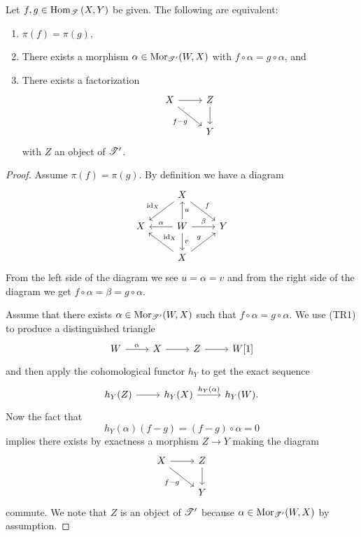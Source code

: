 \documentclass[dissertation.tex]{subfiles}
\begin{document}
\begin{lem}
  Let $f,g \in \operatorname{Hom}_{\mathscr{T}}\left(X,Y\right)$ be given.
  The following are equivalent:
  \begin{enumerate}
  \item
    $\pi(f) = \pi(g)$,
  \item
    There exists a morphism $\alpha \in \operatorname{Mor}_{\mathscr{T}^\prime}(W,X)$ with $f \circ \alpha = g \circ \alpha$, and
  \item
    There exists a factorization
    $$\begin{tikzcd}
      X \arrow{r}\arrow[swap]{rd}{f - g} & Z \arrow{d}\\
      & Y
    \end{tikzcd}$$
    with $Z$ an object of $\mathscr{T}^\prime$.
  \end{enumerate}
  
  \begin{proof}
    Assume $\pi(f) = \pi(g)$.
    By definition we have a diagram
    $$\begin{tikzcd}
      & X \arrow[swap]{ld}{\id_X} \arrow{rd}{f}\\
      X & W \arrow[swap]{l}{\alpha}\arrow[swap]{u}{u}\arrow{d}{v}\arrow{r}{\beta}& Y\\
      & X \arrow[swap]{ul}{\id_X}\arrow{ur}{g}
    \end{tikzcd}$$
    From the left side of the diagram we see $u = \alpha = v$ and from the right side of the diagram we get $f \circ \alpha = \beta = g \circ \alpha$.
    
    Assume that there exists $\alpha \in \operatorname{Mor}_{\mathscr{T}^\prime}(W,X)$ such that $f \circ \alpha = g \circ \alpha$.
    We use (TR1) to produce a distinguished triangle
    $$\begin{tikzcd}
      W \arrow{r}{\alpha} & X \arrow{r} & Z \arrow{r} & W[1]
    \end{tikzcd}$$
    and then apply the cohomological functor $h_Y$ to get the exact sequence
    $$\begin{tikzcd}
      h_Y(Z) \arrow{r} & h_Y(X) \arrow{r}{h_Y(\alpha)} & h_Y(W).
    \end{tikzcd}$$
    Now the fact that
    $$h_Y(\alpha)(f-g) = (f - g)\circ \alpha = 0$$
    implies there exists by exactness a morphism $Z \to Y$ making the diagram
    $$\begin{tikzcd}
      X \arrow{r}\arrow[swap]{rd}{f - g} & Z\arrow{d}\\
      & Y
    \end{tikzcd}$$
    commute.
    We note that $Z$ is an object of $\mathscr{T}^\prime$ because $\alpha \in \operatorname{Mor}_{\mathscr{T}^\prime}(W,X)$ by assumption.
    

\end{proof}
\end{lem}
\end{document}
